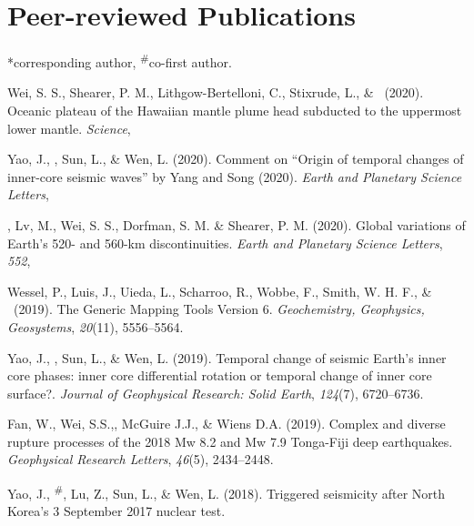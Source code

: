 \newcommand{\Revision}{\textit{under revision}}
\newcommand{\CS}{*} %
\newcommand{\CF}{\textsuperscript{\#}} %

\section*{Peer-reviewed Publications}
\CS corresponding author, \CF co-first author.

\begin{etaremune}
\item Wei, S. S., Shearer, P. M., Lithgow-Bertelloni, C., Stixrude, L., \& \Tian\ (2020).
	Oceanic plateau of the Hawaiian mantle plume head subducted to the uppermost lower mantle.
	\textit{Science}, \\
\item Yao, J., \Tian, Sun, L., \& Wen, L. (2020).
	Comment on ``Origin of temporal changes of inner-core seismic waves'' by Yang and Song (2020).
	\textit{Earth and Planetary Science Letters}, \\
\item \Tian, Lv, M., Wei, S. S., Dorfman, S. M. \& Shearer, P. M. (2020).
	Global variations of Earth's 520- and 560-km discontinuities.
	\textit{Earth and Planetary Science Letters}, \textit{552},
\item
    Wessel, P., Luis, J., Uieda, L., Scharroo, R., Wobbe, F., Smith, W. H. F., \& \Tian\ (2019).
    The Generic Mapping Tools Version 6.
    \textit{Geochemistry, Geophysics, Geosystems}, \textit{20}(11), 5556--5564.
\item
    Yao, J., \Tian, Sun, L., \& Wen, L. (2019).
    Temporal change of seismic Earth's inner core phases: inner core differential rotation or temporal change of inner core surface?.
    \textit{Journal of Geophysical Research: Solid Earth}, \textit{124}(7), 6720--6736.
\item
    Fan, W., Wei, S.S.,\Tian, McGuire J.J., \& Wiens D.A. (2019).
    Complex and diverse rupture processes of the 2018 Mw 8.2 and Mw 7.9 Tonga-Fiji deep earthquakes.
    \textit{Geophysical Research Letters}, \textit{46}(5), 2434--2448.
\item
    Yao, J., \Tian\CF, Lu, Z., Sun, L., \& Wen, L. (2018).
    Triggered seismicity after North Korea's 3 September 2017 nuclear test.

\end{etaremune}
